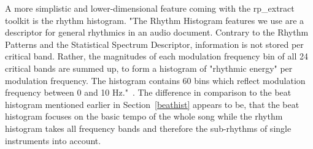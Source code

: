 A more simplistic and lower-dimensional feature coming with the rp\_extract toolkit is the rhythm histogram. "The Rhythm Histogram features we use are a descriptor for general rhythmics in an audio document. Contrary to the Rhythm Patterns and the Statistical Spectrum Descriptor, information is not stored per critical band. Rather, the magnitudes of each modulation frequency bin of all 24 critical bands are summed up, to form a histogram of "rhythmic energy" per modulation frequency. The histogram contains 60 bins which reflect modulation frequency between 0 and 10 Hz."~\cite[p. 3]{rp1}. 
The difference in comparison to the beat histogram mentioned earlier in Section~\ref{beathist} appears to be, that the beat histogram focuses on the basic tempo of the whole song while the rhythm histogram takes all frequency bands and therefore the sub-rhythms of single instruments into account. 

